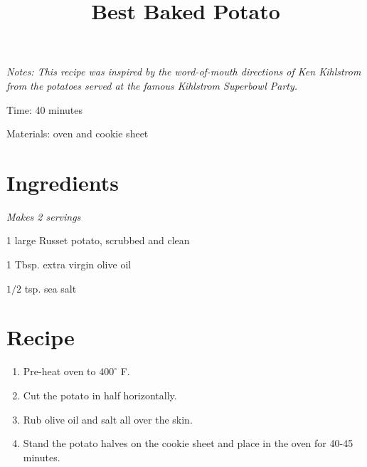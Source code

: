 \documentclass{article}
\title{Best Baked Potato}
\begin{document}
\maketitle

{\small
\textit{Notes: This recipe was inspired by the word-of-mouth directions of Ken Kihlstrom from the potatoes served at the famous Kihlstrom Superbowl Party.}}

Time: 40 minutes

Materials: oven and cookie sheet

\section{Ingredients}
\textit{Makes 2 servings}

1 large Russet potato, scrubbed and clean

1 Tbsp. extra virgin olive oil

$1/2$ tsp. sea salt

\section{Recipe}
\begin{enumerate}
\item{Pre-heat oven to $400^{\circ}$ F.}
\item{Cut the potato in half horizontally.}
\item{Rub olive oil and salt all over the skin.}
\item{Stand the potato halves on the cookie sheet and place in the oven for 40-45 minutes.}
\end{enumerate}
\end{document}
